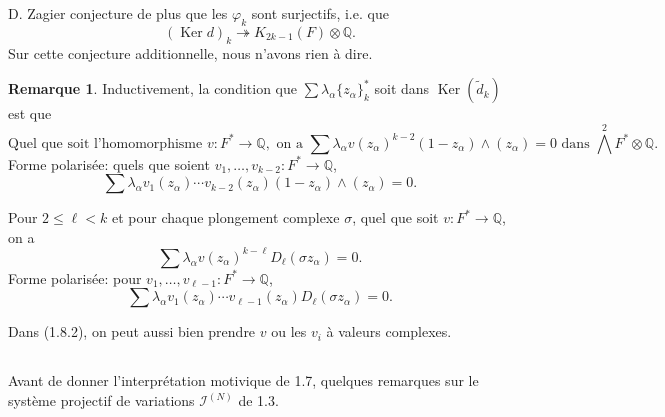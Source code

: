 \documentclass[12pt,a4paper]{article}
\theoremstyle{plain}
\theoremstyle{definition}
\newtheorem{remark}{Remarque}[section]
\theoremstyle{remark}
\DeclareMathOperator*{\Ker}{Ker}
\newcommand{\Q}{\mathbb{Q}}
\begin{document}
D. Zagier conjecture de plus que les $\varphi_k$ sont surjectifs, i.e. que
\begin{equation*}
(\Ker d)_k \twoheadrightarrow K_{2k-1}(F)\otimes\Q.
\end{equation*}
Sur cette conjecture additionnelle, nous n'avons rien {\`a} dire.

\begin{remark}
Inductivement, la condition que $\sum\lambda_\alpha\{z_\alpha\}_k^*$ soit dans $\Ker(\tilde{d}_k)$ est que
\begin{equation}\label{eq:1.8.1}
\text{Quel que soit l'homomorphisme }v:F^*\to\Q,\text{ on a }\sum\lambda_\alpha v(z_\alpha)^{k-2}(1-z_\alpha)\wedge(z_\alpha)=0\text{ dans }\bigwedge^2 F^*\otimes\Q.\tag{1.8.1}
\end{equation}
Forme polaris{\'e}e: quels que soient $v_1,\ldots,v_{k-2}:F^*\to\Q$,
\begin{equation*}
\sum\lambda_\alpha v_1(z_\alpha)\cdots v_{k-2}(z_\alpha)(1-z_\alpha)\wedge(z_\alpha)=0.
\end{equation*}

Pour $2\leq\ell<k$ et pour chaque plongement complexe $\sigma$, quel que soit $v:F^*\to\Q$, on a
\begin{equation}\label{eq:1.8.2}
\sum\lambda_\alpha v(z_\alpha)^{k-\ell}D_\ell(\sigma z_\alpha)=0.\tag{1.8.2}
\end{equation}
Forme polaris{\'e}e: pour $v_1,\ldots,v_{\ell-1}:F^*\to\Q$,
\begin{equation*}
\sum\lambda_\alpha v_1(z_\alpha)\cdots v_{\ell-1}(z_\alpha)D_\ell(\sigma z_\alpha)=0.
\end{equation*}

Dans (1.8.2), on peut aussi bien prendre $v$ ou les $v_i$ {\`a} valeurs complexes.
\end{remark}

\subsection{}

Avant de donner l'interpr{\'e}tation motivique de 1.7, quelques remarques sur le syst{\`e}me projectif de variations $\mathcal{I}^{(N)}$ de 1.3.
\end{document}
